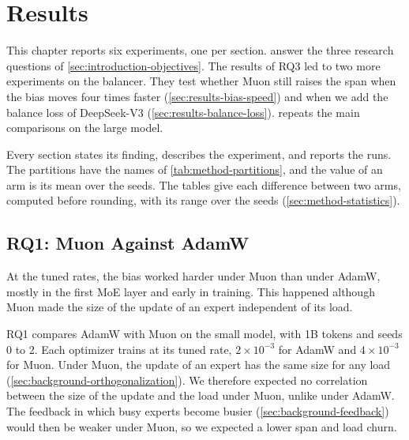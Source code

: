 \chapter{Results}
\label{sec:results}

This chapter reports six experiments, one per section.  answer the three research questions of \cref{sec:introduction-objectives}. The results of RQ3 led to two more experiments on the balancer. They test whether Muon still raises the span when the bias moves four times faster (\cref{sec:results-bias-speed}) and when we add the balance loss of DeepSeek-V3 (\cref{sec:results-balance-loss}).  repeats the main comparisons on the large model.

Every section states its finding, describes the experiment, and reports the runs. The partitions have the names of \cref{tab:method-partitions}, and the value of an arm is its mean over the seeds. The tables give each difference between two arms, computed before rounding, with its range over the seeds (\cref{sec:method-statistics}).

\section{RQ1: Muon Against AdamW}
\label{sec:results-rq1}
At the tuned rates, the bias worked harder under Muon than under AdamW, mostly in the first MoE layer and early in training. This happened although Muon made the size of the update of an expert independent of its load.

RQ1 compares AdamW with Muon on the small model, with 1B tokens and seeds 0 to 2. Each optimizer trains at its tuned rate, $2 \times 10^{-3}$ for AdamW and $4 \times 10^{-3}$ for Muon. Under Muon, the update of an expert has the same size for any load (\cref{sec:background-orthogonalization}). We therefore expected no correlation between the size of the update and the load under Muon, unlike under AdamW\@. The feedback in which busy experts become busier (\cref{sec:background-feedback}) would then be weaker under Muon, so we expected a lower span and load churn.

